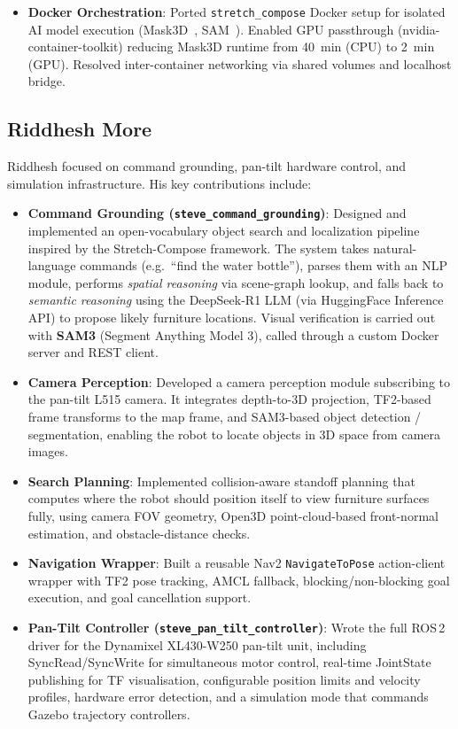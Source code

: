 \documentclass[12pt,oneside,a4paper]{article}
\begin{document}
\begin{itemize}
    \item \textbf{Docker Orchestration}: Ported \texttt{stretch\_compose} Docker setup for isolated AI model execution (Mask3D~\cite{schult2023mask3d}, SAM~\cite{kirillov2023sam}). Enabled GPU passthrough (nvidia-container-toolkit) reducing Mask3D runtime from 40~min (CPU) to 2~min (GPU). Resolved inter-container networking via shared volumes and localhost bridge.
\end{itemize}

\subsection{Riddhesh More}
Riddhesh focused on command grounding, pan-tilt hardware control, and simulation infrastructure. His key contributions include:
\begin{itemize}
    \item \textbf{Command Grounding (\texttt{steve\_command\_grounding})}: Designed and implemented an open-vocabulary object search and localization pipeline inspired by the Stretch-Compose framework. The system takes natural-language commands (e.g.\ ``find the water bottle''), parses them with an NLP module, performs \emph{spatial reasoning} via scene-graph lookup, and falls back to \emph{semantic reasoning} using the DeepSeek-R1 LLM\cite{deepseek2025r1} (via HuggingFace Inference API) to propose likely furniture locations. Visual verification is carried out with \textbf{SAM3} (Segment Anything Model 3)\cite{carion2025sam3}, called through a custom Docker server and REST client.
    \item \textbf{Camera Perception}: Developed a camera perception module subscribing to the pan-tilt L515 camera. It integrates depth-to-3D projection, TF2-based frame transforms to the map frame, and SAM3-based object detection / segmentation, enabling the robot to locate objects in 3D space from camera images.
    \item \textbf{Search Planning}: Implemented collision-aware standoff planning that computes where the robot should position itself to view furniture surfaces fully, using camera FOV geometry, Open3D point-cloud-based front-normal estimation, and obstacle-distance checks.
    \item \textbf{Navigation Wrapper}: Built a reusable Nav2 \texttt{NavigateToPose} action-client wrapper with TF2 pose tracking, AMCL fallback, blocking/non-blocking goal execution, and goal cancellation support.
    \item \textbf{Pan-Tilt Controller (\texttt{steve\_pan\_tilt\_controller})}: Wrote the full ROS\,2 driver for the Dynamixel XL430-W250 pan-tilt unit, including SyncRead/SyncWrite for simultaneous motor control, real-time JointState publishing for TF visualisation, configurable position limits and velocity profiles, hardware error detection, and a simulation mode that commands Gazebo trajectory controllers.


\end{itemize}
\end{document}

